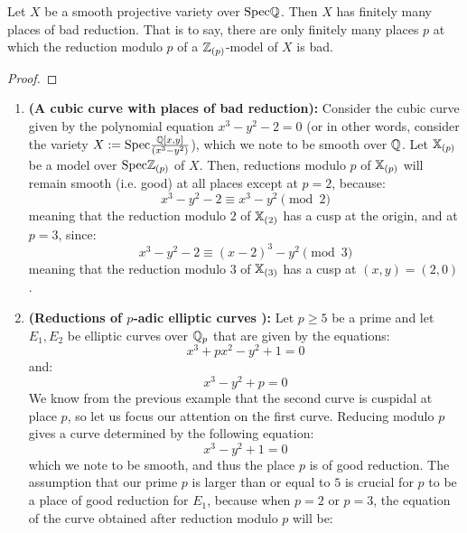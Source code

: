                     \begin{theorem}[Shimura '55]
                        Let $X$ be a smooth projective variety over $\mathrm{Spec} \mathbb{Q}$. Then $X$ has finitely many places of bad reduction. That is to say, there are only finitely many places $p$ at which the reduction modulo $p$ of a $\mathbb{Z}_{(p)}$-model of $X$ is bad.
                    \end{theorem}
                        \begin{proof}
                            
                        \end{proof}
                    \begin{example}
                        \noindent
                        \begin{enumerate}
                            \item \textbf{(A cubic curve with places of bad reduction):} Consider the cubic curve given by the polynomial equation $x^3 - y^2  - 2 = 0$ (or in other words, consider the variety $X := \mathrm{Spec} \frac{\mathbb{Q}[x, y]}{(x^3 - y^2)}$), which we note to be smooth over $\mathbb{Q}$. Let $\mathbb{X}_{(p)}$ be a model over $\mathrm{Spec} \mathbb{Z}_{(p)}$ of $X$. Then, reductions modulo $p$ of $\mathbb{X}_{(p)}$ will remain smooth (i.e. good) at all places except at $p = 2$, because:
                                $$x^3 - y^2 - 2 \equiv x^3 - y^2 \pmod{2}$$
                            meaning that the reduction modulo $2$ of $\mathbb{X}_{(2)}$ has a cusp at the origin, and at $p = 3$, since:
                                $$x^3 - y^2 - 2 \equiv (x - 2)^3 - y^2 \pmod{3}$$
                            meaning that the reduction modulo $3$ of $\mathbb{X}_{(3)}$ has a cusp at $(x, y) = (2, 0)$.
                            \item \textbf{(Reductions of $p$-adic elliptic curves \cite[Example 5.2]{silverman_elliptic_curves}):} Let $p \geq 5$ be a prime and let $E_1, E_2$ be elliptic curves over $\mathbb{Q}_p$ that are given by the equations:
                                $$x^3 + px^2 - y^2 + 1 = 0$$
                            and:
                                $$x^3 - y^2 + p = 0$$
                            We know from the previous example that the second curve is cuspidal at place $p$, so let us focus our attention on the first curve. Reducing modulo $p$ gives a curve determined by the following equation:
                                $$x^3 - y^2 + 1 = 0$$
                            which we note to be smooth, and thus the place $p$ is of good reduction. The assumption that our prime $p$ is larger than or equal to $5$ is crucial for $p$ to be a place of good reduction for $E_1$, because when $p = 2$ or $p = 3$, the equation of the curve obtained after reduction modulo $p$ will be:

\end{enumerate}
\end{example}
